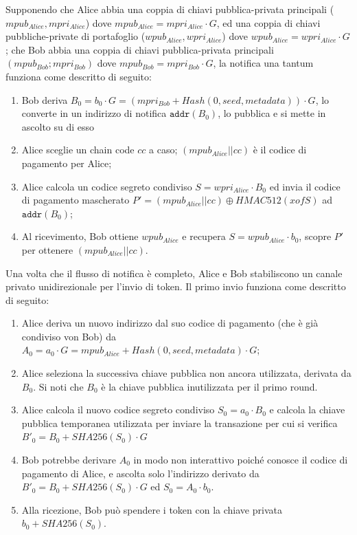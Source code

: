 Supponendo che Alice abbia una coppia di chiavi pubblica-privata principali ($mpub_{Alice}, mpri_{Alice}$) dove $mpub_{Alice} = mpri_{Alice}\cdot G$, ed una coppia di chiavi pubbliche-private di portafoglio ($wpub_{Alice}, wpri_{Alice}$) dove $wpub_{Alice} = wpri_{Alice}\cdot G$; che Bob abbia una coppia di chiavi pubblica-privata principali $(mpub_{Bob}; mpri_{Bob})$ dove $mpub_{Bob} = mpri_{Bob}\cdot G$, la notifica una tantum funziona come descritto di seguito:

\begin{enumerate}
	\item Bob deriva $B_0 = b_0\cdot G = (mpri_{Bob} + Hash(0, seed, metadata))\cdot G$, lo converte in un indirizzo di notifica $\texttt{addr}(B_0)$, lo pubblica e si mette in ascolto su di esso

	\item  Alice sceglie un chain code $cc$ a caso; $(mpub_{Alice}||cc)$ è il codice di pagamento per Alice;

	\item  Alice calcola un codice segreto condiviso $S = wpri_{Alice}\cdot B_0$ ed invia il codice di  pagamento mascherato $P' = (mpub_{Alice}||cc)\oplus HMAC512(xofS)$ ad $\texttt{addr}(B_0)$;

	\item Al ricevimento, Bob ottiene $wpub_{Alice}$ e recupera $S = wpub_{Alice}\cdot b_0$, scopre $P'$ per ottenere $(mpub_{Alice}||cc)$.
\end{enumerate}

Una volta che il flusso di notifica è completo, Alice e Bob stabiliscono un canale privato unidirezionale per l'invio di token. Il primo invio funziona come descritto di seguito:

\begin{enumerate}
	\item Alice deriva un nuovo indirizzo dal suo codice di pagamento (che è già condiviso von Bob) da $A_0 = a_0\cdot G = mpub_{Alice} + Hash(0, seed, metadata)\cdot G$;

	\item Alice seleziona la successiva chiave pubblica non ancora utilizzata, derivata da $B_0$. Si noti che $B_0$ è la chiave pubblica inutilizzata per il primo round.

	\item Alice calcola il nuovo codice segreto condiviso $S_0 = a_0\cdot B_0$ e calcola la chiave pubblica temporanea utilizzata per inviare la transazione per cui si verifica $B'_0 = B_0 + SHA256(S_0)\cdot G$

	\item Bob potrebbe derivare $A_0$ in modo non interattivo poiché conosce il codice di pagamento di Alice, e ascolta solo l'indirizzo derivato da $B'_0 = B_0 + SHA256(S_0)\cdot G$ ed $S_0 = A_0\cdot b_0$.

	\item Alla ricezione, Bob può spendere i token con la chiave privata $b_0 + SHA256(S_0)$.

\end{enumerate}


